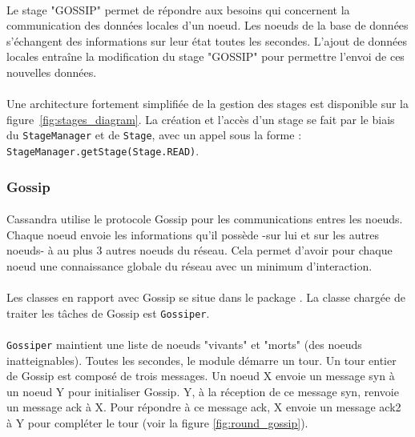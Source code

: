 \documentclass[12pt]{article}
\newcommand{\class}[1]{\texttt{#1}}
\begin{document}
\paragraph{} Le stage "GOSSIP" permet de répondre aux besoins qui concernent la communication des données locales d'un noeud. Les noeuds de la base de données s'échangent des informations sur leur état toutes les secondes. L'ajout de données locales entraîne la modification du stage "GOSSIP" pour permettre l'envoi de ces nouvelles données.

\paragraph{} Une architecture fortement simplifiée de la gestion des stages est disponible sur la figure~\ref{fig:stages_diagram}. La création et l'accès d'un stage se fait par le biais du \class{StageManager} et de \class{Stage}, avec un appel sous la forme : \texttt{StageManager.getStage(Stage.READ)}.

\subsubsection{Gossip}

\paragraph{} Cassandra utilise le protocole Gossip pour les communications entres les noeuds. Chaque noeud envoie les informations qu'il possède -sur lui et sur les autres noeuds- à au plus 3 autres noeuds du réseau. Cela permet d'avoir pour chaque noeud une connaissance globale du réseau avec un minimum d'interaction.
\paragraph{} Les classes en rapport avec Gossip se situe dans le package . La classe chargée de traiter les tâches de Gossip est \class{Gossiper}.
\paragraph{} \class{Gossiper} maintient une liste de noeuds "vivants" et "morts" (des noeuds inatteignables). Toutes les secondes, le module démarre un tour. Un tour entier de Gossip est composé de trois messages. Un noeud X envoie un message syn à un noeud Y pour initialiser Gossip. Y, à la réception de ce message syn, renvoie un message ack à X. Pour répondre à ce message ack, X envoie un message ack2 à Y pour compléter le tour (voir la figure \ref{fig:round_gossip}).
\end{document}
